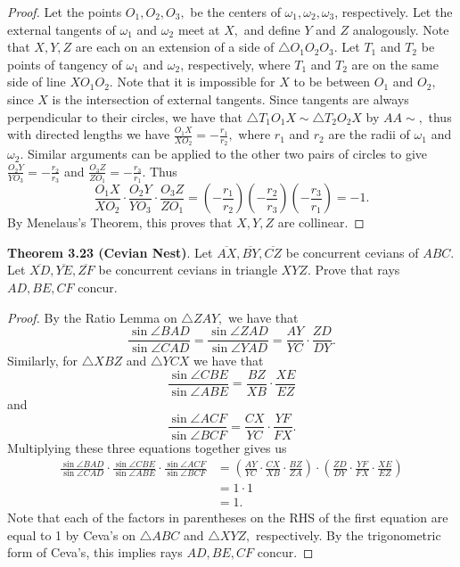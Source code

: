 \documentclass[letterpaper,oneside]{book}
\providecommand{\ol}{\overline}
\begin{document}
\begin{proof}
  Let the points $O_1,O_2,O_3,$ be the centers of $\omega_1, \omega_2, \omega_3$, respectively.
  Let the external tangents of $\omega_1$ and $\omega_2$ meet at $X,$ and define $Y$ and $Z$ analogously. Note that $X,Y,Z$ are each on an extension of a side of $\triangle O_1O_2O_3.$ Let $T_1$ and $T_2$ be points of tangency of $\omega_1$ and $\omega_2$, respectively, where $T_1$ and $T_2$ are on the same side of line $XO_1O_2.$ Note that it is impossible for $X$ to be between $O_1$ and $O_2,$ since $X$ is the intersection of external tangents. Since tangents are always perpendicular to their circles, we have that $\triangle T_1O_1X \sim \triangle T_2O_2X$ by $AA\sim,$ thus with directed lengths we have $\frac{O_1X}{XO_2} = -\frac{r_1}{r_2},$ where $r_1$ and $r_2$ are the radii of $\omega_1$ and $\omega_2.$ Similar arguments can be applied to the other two pairs of circles to give $\frac{O_2Y}{YO_3} = -\frac{r_2}{r_3}$ and $\frac{O_3Z}{ZO_1} = -\frac{r_3}{r_1}.$ Thus
  $$\frac{O_1X}{XO_2}\cdot\frac{O_2Y}{YO_3}\cdot\frac{O_3Z}{ZO_1} = \left(-\frac{r_1}{r_2}\right)\left(-\frac{r_2}{r_3}\right)\left(-\frac{r_3}{r_1}\right) = -1.$$ By Menelaus's Theorem, this proves that $X,Y,Z$ are collinear. 
\end{proof}

\textbf{Theorem 3.23 (Cevian Nest)}. Let $\ol{AX},\ol{BY},\ol{CZ}$ be concurrent cevians of $ABC$. Let $\ol{XD}, \ol{YE},\ol{ZF}$ be concurrent cevians in triangle $XYZ$. Prove that rays $AD,BE,CF$ concur. 

\begin{proof}
  By the Ratio Lemma on $\triangle ZAY,$ we have that
  $$\frac{\sin\angle BAD}{\sin \angle CAD} = \frac{\sin\angle ZAD}{\sin \angle YAD} = \frac{AY}{YC}\cdot\frac{ZD}{DY}.$$
  Similarly, for $\triangle XBZ$ and $\triangle YCX$ we have that
  $$\frac{\sin\angle CBE}{\sin \angle ABE} = \frac{BZ}{XB}\cdot\frac{XE}{EZ}$$ and $$\frac{\sin\angle ACF}{\sin \angle BCF} = \frac{CX}{YC}\cdot\frac{YF}{FX}.$$
  Multiplying these three equations together gives us
  \begin{align*}
  \frac{\sin\angle BAD}{\sin \angle CAD}\cdot\frac{\sin\angle CBE}{\sin \angle ABE}\cdot\frac{\sin\angle ACF}{\sin \angle BCF} &= \left(\frac{AY}{YC}\cdot\frac{CX}{XB}\cdot\frac{BZ}{ZA}\right)\cdot\left(\frac{ZD}{DY}\cdot\frac{YF}{FX}\cdot\frac{XE}{EZ}\right)\\
  &= 1\cdot1 \\
  &= 1.
\end{align*}
  Note that each of the factors in parentheses on the RHS of the first equation are equal to 1 by Ceva's on $\triangle ABC$ and $\triangle XYZ,$ respectively. By the trigonometric form of Ceva's, this implies rays $AD,BE,CF$ concur.
\end{proof}
\end{document}
